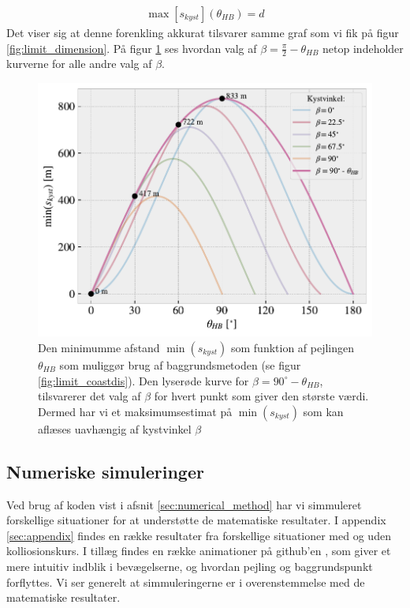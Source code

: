 \documentclass[%
 reprint,
nofootinbib,
aps,
]{revtex4-1}
\begin{document}
\begin{align}
  \max{[s_{kyst}]}(\theta_{HB}) = d
  \label{eq:max_s_kyst}
\end{align}
Det viser sig at denne forenkling akkurat tilsvarer samme graf som vi fik på figur \ref{fig:limit_dimension}. På figur \ref{fig:limit_coastdis_betamax} ses hvordan valg af $\beta = \frac{\pi}{2} - \theta_{HB}$ netop indeholder kurverne for alle andre valg af $\beta$.
\begin{figure}[H]
  \includegraphics[width=\linewidth]{figures/limit_coastdis_betamax.pdf}
  \caption{Den minimumme afstand $\min{(s_{kyst})}$ som funktion af pejlingen $\theta_{HB}$ som muliggør brug af baggrundsmetoden (se figur \ref{fig:limit_coastdis}). Den lyserøde kurve for $\beta = 90^{\circ} - \theta_{HB}$, tilsvarerer det valg af $\beta$ for hvert punkt som giver den største værdi. Dermed har vi et maksimumsestimat på $\min{(s_{kyst})}$ som kan aflæses uavhængig af kystvinkel $\beta$ }
  \label{fig:limit_coastdis_betamax}
\end{figure}

\subsection{Numeriske simuleringer}
Ved brug af koden vist i afsnit \ref{sec:numerical_method} har vi simmuleret forskellige situationer for at understøtte de matematiske resultater. I appendix \ref{sec:appendix} findes en række resultater fra forskellige situationer med og uden kolliosionskurs. I tillæg findes en række animationer på github'en \cite{github}, som giver et mere intuitiv indblik i bevægelserne, og hvordan pejling og baggrundspunkt forflyttes. Vi ser generelt at simmuleringerne er i overenstemmelse med de matematiske resultater.
\end{document}
